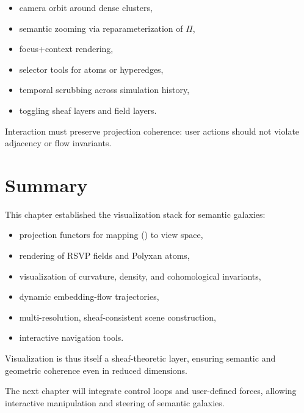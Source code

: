 \begin{itemize}
\item camera orbit around dense clusters,
\item semantic zooming via reparameterization of $\Pi$,
\item focus+context rendering,
\item selector tools for atoms or hyperedges,
\item temporal scrubbing across simulation history,
\item toggling sheaf layers and field layers.
\end{itemize}

Interaction must preserve projection coherence:
user actions should not violate adjacency or flow invariants.


\section{Summary}

This chapter established the visualization stack for semantic galaxies:

\begin{itemize}
  \item projection functors for mapping () to view space,
  \item rendering of RSVP fields and Polyxan atoms,
  \item visualization of curvature, density, and cohomological invariants,
  \item dynamic embedding-flow trajectories,
  \item multi-resolution, sheaf-consistent scene construction,
  \item interactive navigation tools.
\end{itemize}

Visualization is thus itself a sheaf-theoretic layer,
ensuring semantic and geometric coherence even in reduced dimensions.

The next chapter will integrate control loops and user-defined forces,
allowing interactive manipulation and steering of semantic galaxies.

